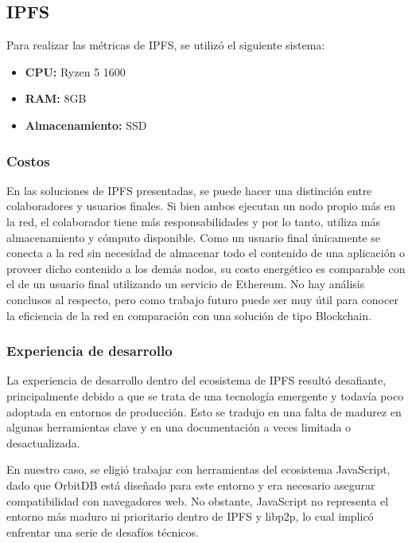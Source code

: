 \subsection{IPFS}

Para realizar las métricas de IPFS, se utilizó el siguiente sistema:
\begin{itemize}
    \item \textbf{CPU:} Ryzen 5 1600
    \item \textbf{RAM:} 8GB
    \item \textbf{Almacenamiento:} SSD
\end{itemize}

\subsubsection{Costos}

En las soluciones de IPFS presentadas, se puede hacer una distinción entre colaboradores y usuarios finales. Si bien ambos ejecutan un nodo propio más en la red, el colaborador tiene más responsabilidades y por lo tanto, utiliza más almacenamiento y cómputo disponible. Como un usuario final únicamente se conecta a la red sin necesidad de almacenar todo el contenido de una aplicación o proveer dicho contenido a los demás nodos, su costo energético es comparable con el de un usuario final utilizando un servicio de Ethereum.
No hay análisis conclusos al respecto, pero como trabajo futuro puede ser muy útil para conocer la eficiencia de la red en comparación con una solución de tipo Blockchain.

\subsubsection{Experiencia de desarrollo}

La experiencia de desarrollo dentro del ecosistema de IPFS resultó desafiante, principalmente debido a que se trata de una tecnología emergente y todavía poco adoptada en entornos de producción. Esto se tradujo en una falta de madurez en algunas herramientas clave y en una documentación a veces limitada o desactualizada.

En nuestro caso, se eligió trabajar con herramientas del ecosistema JavaScript, dado que OrbitDB está diseñado para este entorno y era necesario asegurar compatibilidad con navegadores web. No obstante, JavaScript no representa el entorno más maduro ni prioritario dentro de IPFS y libp2p, lo cual implicó enfrentar una serie de desafíos técnicos.


